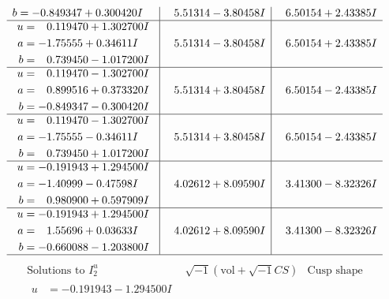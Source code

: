 \documentclass[1p]{elsarticle_modified}
\theoremstyle{definition}
\newcommand{\I}{\sqrt{-1}}
\begin{document}
$$\begin{array}{c|c|c}
\begin{aligned}
b &= -0.849347 + 0.300420 I\end{aligned}
 & \phantom{-}5.51314 - 3.80458 I & \phantom{-}6.50154 + 2.43385 I \\ \hline\begin{aligned}
u &= \phantom{-}0.119470 + 1.302700 I \\
a &= -1.75555 + 0.34611 I \\
b &= \phantom{-}0.739450 - 1.017200 I\end{aligned}
 & \phantom{-}5.51314 - 3.80458 I & \phantom{-}6.50154 + 2.43385 I \\ \hline\begin{aligned}
u &= \phantom{-}0.119470 - 1.302700 I \\
a &= \phantom{-}0.899516 + 0.373320 I \\
b &= -0.849347 - 0.300420 I\end{aligned}
 & \phantom{-}5.51314 + 3.80458 I & \phantom{-}6.50154 - 2.43385 I \\ \hline\begin{aligned}
u &= \phantom{-}0.119470 - 1.302700 I \\
a &= -1.75555 - 0.34611 I \\
b &= \phantom{-}0.739450 + 1.017200 I\end{aligned}
 & \phantom{-}5.51314 + 3.80458 I & \phantom{-}6.50154 - 2.43385 I \\ \hline\begin{aligned}
u &= -0.191943 + 1.294500 I \\
a &= -1.40999 - 0.47598 I \\
b &= \phantom{-}0.980900 + 0.597909 I\end{aligned}
 & \phantom{-}4.02612 + 8.09590 I & \phantom{-}3.41300 - 8.32326 I \\ \hline\begin{aligned}
u &= -0.191943 + 1.294500 I \\
a &= \phantom{-}1.55696 + 0.03633 I \\
b &= -0.660088 - 1.203800 I\end{aligned}
 & \phantom{-}4.02612 + 8.09590 I & \phantom{-}3.41300 - 8.32326 I\\
 \hline 
 \end{array}$$\newpage$$\begin{array}{c|c|c}  
\text{Solutions to }I^u_{2}& \I (\text{vol} + \sqrt{-1}CS) & \text{Cusp shape}\\
 \hline 
\begin{aligned}
u &= -0.191943 - 1.294500 I \\

\end{aligned}
\end{array}$$
\end{document}
